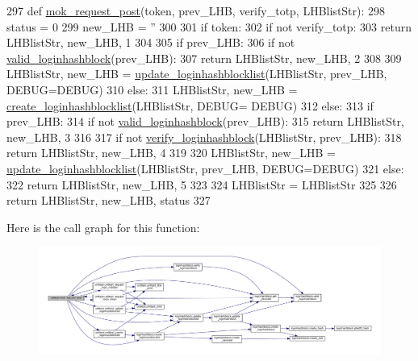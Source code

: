 \begin{DoxyCode}
297 \textcolor{keyword}{def }\hyperlink{namespaceunittest_afeccd95cc658ca5f2ffb4df7a1edbbd2}{mok\_request\_post}(token, prev\_LHB, verify\_totp, LHBlistStr):
298     status = 0
299     new\_LHB = \textcolor{stringliteral}{''}
300 
301     \textcolor{keywordflow}{if} token:
302         \textcolor{keywordflow}{if} \textcolor{keywordflow}{not} verify\_totp:
303             \textcolor{keywordflow}{return} LHBlistStr, new\_LHB, 1
304 
305         \textcolor{keywordflow}{if} prev\_LHB:
306             \textcolor{keywordflow}{if} \textcolor{keywordflow}{not} \hyperlink{namespaceloginhashblock_adb424539d851426da7b65d53c5a6d577}{valid\_loginhashblock}(prev\_LHB):
307                 \textcolor{keywordflow}{return} LHBlistStr, new\_LHB, 2
308 
309             LHBlistStr, new\_LHB = \hyperlink{namespaceloginhashblock_a2bcc7ddd0fcc3788572dd77808cb624d}{update\_loginhashblocklist}(LHBlistStr, prev\_LHB, 
      DEBUG=DEBUG)
310         \textcolor{keywordflow}{else}:
311             LHBlistStr, new\_LHB = \hyperlink{namespaceloginhashblock_a550707107141dfb228ca4294d7ea31b4}{create\_loginhashblocklist}(LHBlistStr, DEBUG=
      DEBUG)
312     \textcolor{keywordflow}{else}:
313         \textcolor{keywordflow}{if} prev\_LHB:
314             \textcolor{keywordflow}{if} \textcolor{keywordflow}{not} \hyperlink{namespaceloginhashblock_adb424539d851426da7b65d53c5a6d577}{valid\_loginhashblock}(prev\_LHB):
315                 \textcolor{keywordflow}{return} LHBlistStr, new\_LHB, 3
316 
317             \textcolor{keywordflow}{if} \textcolor{keywordflow}{not} \hyperlink{namespaceloginhashblock_aa5bb94484a68d0bbebce23b4cfeeb4b7}{verify\_loginhashblock}(LHBlistStr, prev\_LHB):
318                 \textcolor{keywordflow}{return} LHBlistStr, new\_LHB, 4
319 
320             LHBlistStr, new\_LHB = \hyperlink{namespaceloginhashblock_a2bcc7ddd0fcc3788572dd77808cb624d}{update\_loginhashblocklist}(LHBlistStr, prev\_LHB, 
      DEBUG=DEBUG)
321         \textcolor{keywordflow}{else}:
322             \textcolor{keywordflow}{return} LHBlistStr, new\_LHB, 5
323 
324     LHBlistStr = LHBlistStr
325 
326     \textcolor{keywordflow}{return} LHBlistStr, new\_LHB, status
327 
\end{DoxyCode}


Here is the call graph for this function\+:\nopagebreak
\begin{figure}[H]
\begin{center}
\leavevmode
\includegraphics[width=350pt]{namespaceunittest_afeccd95cc658ca5f2ffb4df7a1edbbd2_cgraph}
\end{center}
\end{figure}




